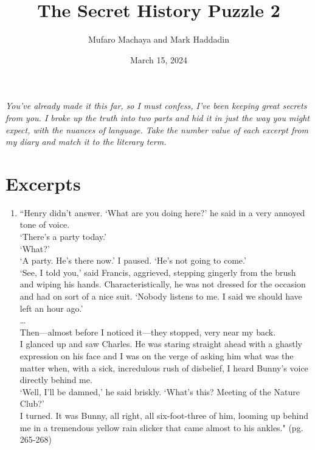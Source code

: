 \documentclass[11pt]{article}
\title{The Secret History Puzzle 2}
\author{Mufaro Machaya and Mark Haddadin}
\date{March 15, 2024}
\newcommand{\mi}{\hspace*{5mm}}
\newcommand{\psep}{\\ \mi}
\begin{document}
\begin{titlingpage}
\maketitle
\end{titlingpage}

\noindent
\textit{You've already made it this far, so I must confess, I've been keeping great secrets from you. I broke up the truth into two parts and hid it in just the way you might expect, with the nuances of language. Take the number value of each excerpt from my diary and match it to the literary term.} \\

\section*{Excerpts}

\begin{minipage}{\textwidth}
\begin{enumerate}[resume=main]
  \item \mi ``Henry didn’t answer. `What are you doing here?' he said in a very annoyed tone of voice. \psep `There’s a party today.' \psep `What?' \psep `A party. He’s there now.' I paused. `He’s not going to come.' \psep `See, I told you,' said Francis, aggrieved, stepping gingerly from the brush and wiping his hands. Characteristically, he was not dressed for the occasion and had on sort of a nice suit. `Nobody listens to me. I said we should have left an hour ago.' \psep \dots \psep Then—almost before I noticed it—they stopped, very near my back. \psep I glanced up and saw Charles. He was staring straight ahead with a ghastly expression on his face and I was on the verge of asking him what was the matter when, with a sick, incredulous rush of disbelief, I heard Bunny’s voice directly behind me. \psep `Well, I’ll be damned,' he said briskly. `What’s this? Meeting of the Nature Club?' \psep I turned. It was Bunny, all right, all six-foot-three of him, looming up behind me in a tremendous yellow rain slicker that came almost to his ankles." (pg. 265-268) \\
\end{enumerate}
\end{minipage}
\end{document}
